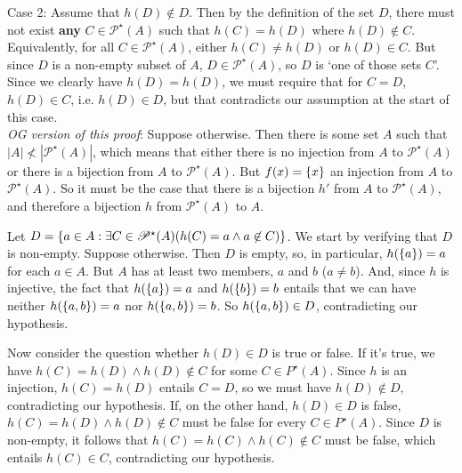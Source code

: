 \documentclass[12pt,letterpaper]{article}
\begin{document}
\begin{enumerate}
\begin{enumerate}
{Case 2: Assume that $h(D) \notin D$. Then by the definition of the set $D$, there must not exist \textbf{any} $C \in \mathscr{P}^\star(A)$ such that $h(C) = h(D)$ where $h(D) \notin C$. Equivalently, for all $C \in \mathscr{P}^\star(A)$, either $h(C) \neq h(D)$ or $h(D) \in C$. But since $D$ is a non-empty subset of $A$, $D \in  \mathscr{P}^\star(A)$, so $D$ is `one of those sets $C$'. Since we clearly have $h(D) = h(D)$, we must require that for $C = D$, $h(D) \in C$, i.e. $h(D) \in D$, but that contradicts our assumption at the start of this case. \\ [2ex]




\textit{OG version of this proof}: Suppose otherwise. Then there is some set $A$ such that $|A| \not< |\mathscr{P}^\star(A)|$, which means that either there is no injection from $A$ to $\mathscr{P}^\star(A)$ or there is a bijection from $A$  to $\mathscr{P}^\star(A)$. But $f(x) = \left\{ {x} \right\}$ an injection from $A$ to $\mathscr{P}^\star(A)$. So it must be the case that there is a bijection $h'$ from $A$ to $\mathscr{P}^\star(A)$, and therefore a bijection $h$ from $\mathscr{P}^\star(A)$ to $A$.

Let $D = \left\{ {a \in A : \exists C \in \mathscr{P}^\star(A) (h(C) = a \wedge a \not\in C)} \right\}$. We start by verifying that $D$ is non-empty. Suppose otherwise. Then $D$ is empty, so, in particular, $h(\left\{ {a} \right\}) = a$ for each $a \in A$. But $A$ has at least two members, $a$ and $b$ ($a \neq b$). And, since $h$ is injective, the fact that $h(\left\{ {a} \right\}) = a$ and $h(\left\{ {b} \right\}) = b$ entails that we can have neither $ h(\left\{ {a,b} \right\}) = a $ nor $h(\left\{ {a,b} \right\}) = b$. So $h(\left\{ {a,b} \right\}) \in D$, contradicting our hypothesis.

Now consider the question whether $h(D) \in D$ is true or false. If it's true, we have $h(C) = h(D) \wedge h(D) \not\in C$ for some $C \in \mathscr{}P^\star(A)$. Since $h$ is an injection, $h(C) = h(D)$ entails $C = D$, so we must have $h(D) \not\in D$, contradicting our hypothesis. If, on the other hand, $h(D) \in D$ is false, $h(C) = h(D) \wedge h(D) \not\in C$ must be false for every $C \in \mathscr{}P^\star(A)$. Since $D$ is non-empty, it follows that $h(C) = h(C) \wedge h(C) \not\in C$ must be false, which entails $h(C) \in C$, contradicting our hypothesis.
}

\end{enumerate}


\end{enumerate}






\end{document}
